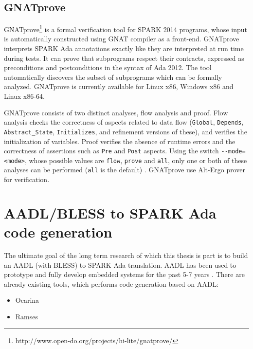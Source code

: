 \subsection{GNATprove}
\label{background:sparkverification:gnatprove}

GNATprove\footnote{http://www.open-do.org/projects/hi-lite/gnatprove/} is a formal verification tool for SPARK 2014 programs, whose input is automatically constructed using GNAT compiler as a front-end. GNATprove interprets SPARK Ada annotations exactly like they are interpreted at run time during tests. It can prove that subprograms respect their contracts, expressed as preconditions and postconditions in the syntax of Ada 2012. The tool automatically discovers the subset of subprograms which can be formally analyzed. GNATprove is currently available for Linux x86, Windows x86 and Linux x86-64.

GNATprove consists of two distinct analyses, flow analysis and proof. Flow analysis checks the correctness of aspects related to data flow (\lstinline{Global}, \lstinline{Depends}, \lstinline{Abstract_State}, \lstinline{Initializes}, and refinement versions of these), and verifies the initialization of variables. Proof verifies the absence of runtime errors and the correctness of assertions such as \lstinline{Pre} and \lstinline{Post} aspects. Using the switch \lstinline{--mode=<mode>}, whose possible values are \lstinline{flow}, \lstinline{prove} and \lstinline{all}, only one or both of these analyses can be performed (\lstinline{all} is the default) \cite{Spark2014userGuide:Online}. GNATprove use Alt-Ergo prover for verification.



\section{AADL/BLESS to SPARK Ada code generation}
\label{background:codegen}

The ultimate goal of the long term research of which this thesis is part is to build an AADL (with BLESS) to SPARK Ada translation. AADL has been used to prototype and fully develop embedded systems for the past 5-7 years \cite{PrototypyingAadl:Paper}. There are already existing tools, which performs code generation based on AADL:
\begin{itemize}
	\item Ocarina
	\item Ramses
\end{itemize}



